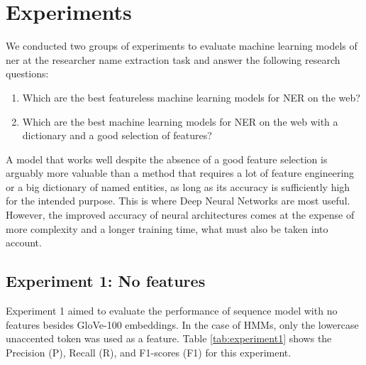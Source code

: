 \documentclass{nle}
\begin{document}
\section{Experiments}

We conducted two groups of experiments to evaluate machine learning models of 
\gls{ner} at the researcher name extraction task and answer the following 
research questions:
%
\begin{enumerate}
\item Which are the best featureless machine learning models for NER on the web?
\item Which are the best machine learning models for NER on the web with a dictionary and a good selection of features?
\end{enumerate}
%
A model that works well despite the absence of a good feature selection is arguably more valuable than
a method that requires a lot of feature engineering or a big dictionary of named entities, as long as 
its accuracy is sufficiently high for the intended purpose. This is where Deep Neural Networks are most
useful. However, the improved accuracy of neural architectures comes at the expense of more complexity
and a longer training time, what must also be taken into account. 


\subsection{Experiment 1: No features}

Experiment 1 aimed to evaluate the performance of sequence model with no features
besides GloVe-100 embeddings. In the case of HMMs, only the lowercase
unaccented token was used as a feature. Table \ref{tab:experiment1} 
shows the Precision (P), Recall (R), and F1-scores (F1) for this
experiment.
\end{document}
